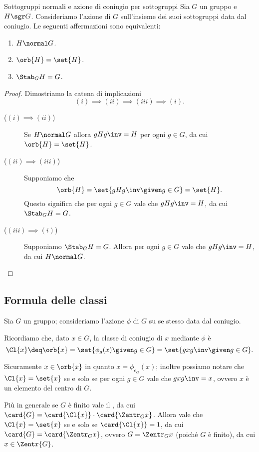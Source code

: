 \begin{proposition}{Sottogruppi normali e azione di coniugio per sottogruppi}{}
    Sia $G$ un gruppo e $H \sgr G$. 
    Consideriamo l'azione di $G$ sull'insieme dei suoi sottogruppi data dal coniugio.
    Le seguenti affermazioni sono equivalenti:
    \begin{enumerate}[label={(\roman*)}]
        \item $H \normal G$.
        \item $\orb{H} = \set{H}$.
        \item $\Stab_{G}{H} = G$.
    \end{enumerate}
\end{proposition}
\begin{proof}
    Dimostriamo la catena di implicazioni \[
        (i) \implies (ii) \implies (iii) \implies (i).    
    \]
    \begin{description}
        \item[($(i) \implies (ii)$)] Se $H \normal G$ allora $gHg\inv = H$ per ogni $g \in G$, da cui $\orb{H} = \set{H}$.
        \item[($(ii) \implies (iii)$)] Supponiamo che \[
            \orb{H} = \set{gHg\inv \given g \in G} = \set{H}.    
        \] Questo significa che per ogni $g \in G$ vale che $gHg\inv = H$, da cui $\Stab_{G}{H} = G$.
        \item[($(iii) \implies (i)$)] Supponiamo $\Stab_{G}{H} = G$. Allora per ogni $g \in G$ vale che $gHg\inv = H$, da cui $H \normal G$.
    \end{description}
\end{proof}

\subsection{Formula delle classi}
Sia $G$ un gruppo; consideriamo l'azione $\phi$ di $G$ su se stesso data dal coniugio.

Ricordiamo che, dato $x \in G$, la classe di coniugio di $x$ mediante $\phi$ è \[
    \Cl{x} \deq \orb{x} = \set{\phi_g(x) \given g \in G} = \set{gxg\inv \given g \in G}.    
\]

Sicuramente $x \in \orb{x}$ in quanto $x = \phi_{e_G}(x)$; inoltre possiamo notare che $\Cl{x} = \set{x}$ se e solo se per ogni $g \in G$ vale che $gxg\inv = x$, ovvero $x$ è un elemento del centro di $G$.

Più in generale se $G$ è finito vale il , da cui $\card{G} = \card{\Cl{x}}\cdot \card{\Zentr_{G}{x}}$. Allora vale che $\Cl{x} = \set{x}$ se e solo se $\card{\Cl{x}} = 1$, da cui $\card{G} = \card{\Zentr_{G}{x}}$, ovvero $G = \Zentr_{G}{x}$ (poiché $G$ è finito), da cui $x \in \Zentr{G}$.

